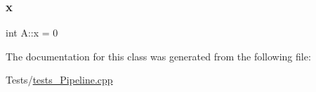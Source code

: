 \mbox{\label{class_a_ac88449f5677bb5bf7923a9127979a200}} 
\subsubsection{\texorpdfstring{x}{x}}
{\footnotesize\ttfamily int A\+::x = 0}



The documentation for this class was generated from the following file\+:\begin{DoxyCompactItemize}
\item 
Tests/\mbox{\hyperlink{tests___pipeline_8cpp}{tests\+\_\+\+Pipeline.\+cpp}}\end{DoxyCompactItemize}

